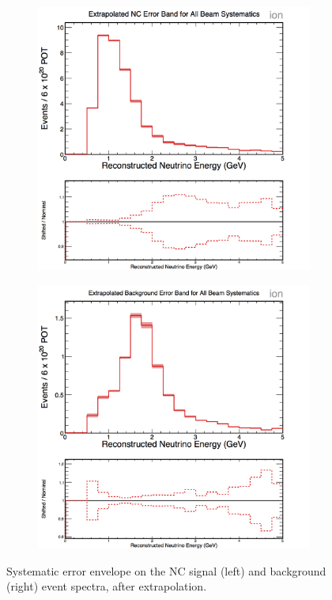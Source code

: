 \begin{figure}[h]
  \centering
  \begin{subfigure}{.48\textwidth}
    \centering
    \includegraphics[width=1\linewidth]{figures/cNCEXBeamSysts.png}
  \end{subfigure}
  \begin{subfigure}{.48\textwidth}
    \centering
    \includegraphics[width=1\linewidth]{figures/cBGEXBeamSysts.png}
  \end{subfigure}
  \caption[Beam Systematic Error Envelopes]{Systematic error envelope on the NC signal (left) and background (right) event spectra, after extrapolation.}
  \label{fig:SystBeam}
\end{figure}

